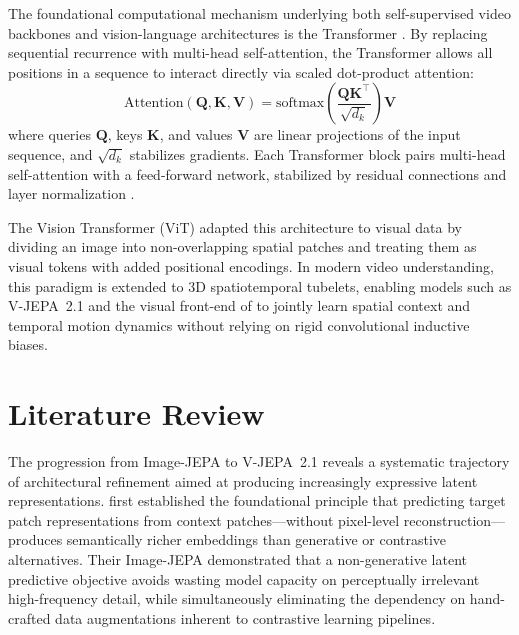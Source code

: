 The foundational computational mechanism underlying both self-supervised video backbones and vision-language architectures is the Transformer \citep{vaswani2017attention}. By replacing sequential recurrence with multi-head self-attention, the Transformer allows all positions in a sequence to interact directly via scaled dot-product attention:
\begin{equation}
\text{Attention}(\mathbf{Q}, \mathbf{K}, \mathbf{V}) = \text{softmax}\!\left(\frac{\mathbf{Q}\mathbf{K}^\top}{\sqrt{d_k}}\right)\mathbf{V}
\label{eq:self_attention}
\end{equation}
where queries $\mathbf{Q}$, keys $\mathbf{K}$, and values $\mathbf{V}$ are linear projections of the input sequence, and $\sqrt{d_k}$ stabilizes gradients. Each Transformer block pairs multi-head self-attention with a feed-forward network, stabilized by residual connections \citep{he2016resnet} and layer normalization \citep{ba2016layernorm}.

The Vision Transformer (ViT) \citep{dosovitskiy2021vit} adapted this architecture to visual data by dividing an image into non-overlapping spatial patches and treating them as visual tokens with added positional encodings. In modern video understanding, this paradigm is extended to 3D spatiotemporal tubelets, enabling models such as V-JEPA~2.1 and the visual front-end of \qwenvl{} to jointly learn spatial context and temporal motion dynamics without relying on rigid convolutional inductive biases.

\section{Literature Review}

The progression from Image-JEPA to V-JEPA~2.1 reveals a systematic trajectory of architectural refinement aimed at producing increasingly expressive latent representations. \citet{assran2023ijepa} first established the foundational principle that predicting target patch representations from context patches---without pixel-level reconstruction---produces semantically richer embeddings than generative or contrastive alternatives. Their Image-JEPA demonstrated that a non-generative latent predictive objective avoids wasting model capacity on perceptually irrelevant high-frequency detail, while simultaneously eliminating the dependency on hand-crafted data augmentations inherent to contrastive learning pipelines.

